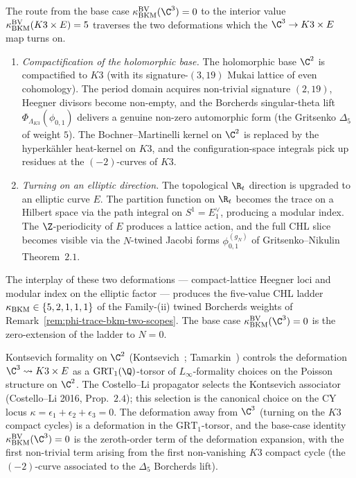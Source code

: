 \begin{remark}
\label{rem:bl-bv-c3-deformation}
The route from the base case $\kBKM^{\mathrm{BV}}(\C^3) = 0$ to
the interior value $\kappa_{\mathrm{BKM}}^{\mathrm{BV}}(K3\times E) = 5$ traverses
the two deformations which the $\C^3 \to K3\times E$ map turns on.
\begin{enumerate}[label=(\roman*)]
\item \emph{Compactification of the holomorphic base.}
The holomorphic base $\C^2$ is compactified to $K3$ (with its
signature-$(3,19)$ Mukai lattice of even cohomology). The period
domain acquires non-trivial signature $(2, 19)$, Heegner divisors
become non-empty, and the Borcherds singular-theta lift
$\Phi_{\Lambda_{K3}}(\phi_{0,1})$ delivers a genuine non-zero
automorphic form (the Gritsenko $\Delta_5$ of weight $5$). The
Bochner--Martinelli kernel on $\C^2$ is replaced by the
hyperkähler heat-kernel on $K3$, and the configuration-space
integrals pick up residues at the $(-2)$-curves of $K3$.
\item \emph{Turning on an elliptic direction.}
The topological $\R_t$ direction is upgraded to an elliptic curve
$E$. The partition function on $\R_t$ becomes the trace on a
Hilbert space via the path integral on $S^1 = E^\vee_1$, producing
a modular index. The $\Z$-periodicity of $E$ produces a lattice
action, and the full CHL slice becomes visible via the
$N$-twined Jacobi forms $\phi^{(g_N)}_{0, 1}$ of
Gritsenko--Nikulin~\cite{GritsenkoNikulin1997} Theorem~$2.1$.
\end{enumerate}
The interplay of these two deformations — compact-lattice Heegner
loci and modular index on the elliptic factor — produces the
five-value CHL ladder $\kappa_{\mathrm{BKM}}\in\{5, 2, 1, 1, 1\}$ of the Family-(ii)
twined Borcherds weights of Remark~\ref{rem:phi-trace-bkm-two-scopes}.
The base case $\kBKM^{\mathrm{BV}}(\C^3) = 0$ is the zero-extension
of the ladder to $N = 0$.
\end{remark}

\begin{remark}
\label{rem:bl-bv-c3-kontsevich-deformation}
Kontsevich formality on $\C^2$
(Kontsevich~\cite{Kontsevich1999}; Tamarkin~\cite{Tamarkin2003})
controls the deformation $\C^3\rightsquigarrow K3\times E$ as a
$\mathrm{GRT}_1(\Q)$-torsor of $L_\infty$-formality choices on the
Poisson structure on $\C^2$. The Costello--Li propagator
selects the Kontsevich associator (Costello--Li 2016, Prop.~$2.4$);
this selection is the canonical choice on the CY locus
$\kappa = \epsilon_1 + \epsilon_2 + \epsilon_3 = 0$. The
deformation away from $\C^3$ (turning on the $K3$ compact cycles)
is a deformation in the $\mathrm{GRT}_1$-torsor, and the base-case
identity $\kBKM^{\mathrm{BV}}(\C^3) = 0$ is the zeroth-order term
of the deformation expansion, with the first non-trivial term
arising from the first non-vanishing $K3$ compact cycle (the
$(-2)$-curve associated to the $\Delta_5$ Borcherds lift).
\end{remark}

